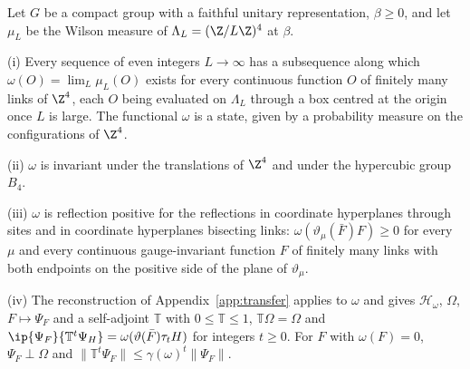 \begin{lemma}\label{rE:torus}
Let $G$ be a compact group with a faithful unitary representation, $\beta\ge0$,
and let $\mu_L$ be the Wilson measure of $\Lambda_L=(\Z/L\Z)^4$ at $\beta$.

\textup{(i)} Every sequence of even integers $L\to\infty$ has a subsequence
along which $\omega(O)=\lim_L\mu_L(O)$ exists for every continuous function
$O$ of finitely many links of $\Z^4$, each $O$ being evaluated on $\Lambda_L$
through a box centred at the origin once $L$ is large. The functional
$\omega$ is a state, given by a probability measure on the configurations of
$\Z^4$.

\textup{(ii)} $\omega$ is invariant under the translations of $\Z^4$ and under
the hypercubic group $B_4$.

\textup{(iii)} $\omega$ is reflection positive for the reflections in
coordinate hyperplanes through sites and in coordinate hyperplanes bisecting
links: $\omega(\vartheta_\mu(\bar F)F)\ge0$ for every $\mu$ and every
continuous gauge-invariant function $F$ of finitely many links with both
endpoints on the positive side of the plane of $\vartheta_\mu$.

\textup{(iv)} The reconstruction of Appendix~\ref{app:transfer} applies to
$\omega$ and gives $\mathcal H_\omega$, $\Omega$, $F\mapsto\Psi_F$ and a
self-adjoint $\mathbb T$ with $0\le\mathbb T\le1$, $\mathbb T\Omega=\Omega$
and $\ip{\Psi_F}{\mathbb T^t\Psi_H}=\omega(\vartheta(\bar F)\tau_tH)$ for
integers $t\ge0$. For $F$ with $\omega(F)=0$, $\Psi_F\perp\Omega$ and
$\|\mathbb T^t\Psi_F\|\le\gamma(\omega)^t\|\Psi_F\|$.
\end{lemma}

